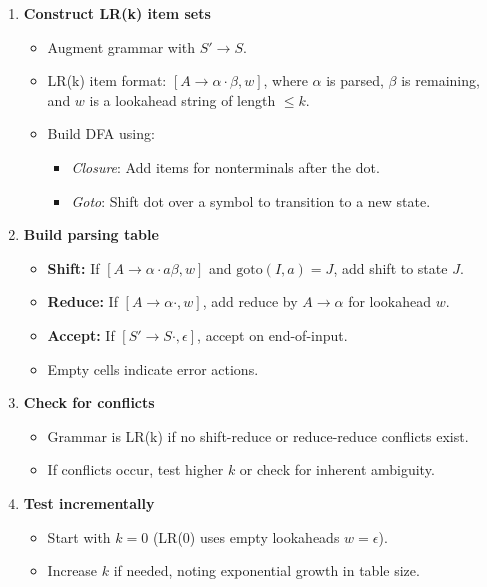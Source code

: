 \begin{enumerate}
    \item \textbf{Construct LR(k) item sets}
    \begin{itemize}
        \item Augment grammar with \( S' \to S \).
        \item LR(k) item format: \( [A \to \alpha \cdot \beta, w] \), where \( \alpha \) is parsed, \( \beta \) is remaining, and \( w \) is a lookahead string of length \( \leq k \).
        \item Build DFA using:
        \begin{itemize}
            \item \emph{Closure}: Add items for nonterminals after the dot.
            \item \emph{Goto}: Shift dot over a symbol to transition to a new state.
        \end{itemize}
    \end{itemize}

    \item \textbf{Build parsing table}
    \begin{itemize}
        \item \textbf{Shift:} If \( [A \to \alpha \cdot a \beta, w] \) and \(\text{goto}(I, a) = J\), add shift to state \( J \).
        \item \textbf{Reduce:} If \( [A \to \alpha \cdot, w] \), add reduce by \( A \to \alpha \) for lookahead \( w \).
        \item \textbf{Accept:} If \( [S' \to S \cdot, \epsilon] \), accept on end-of-input.
        \item Empty cells indicate error actions.
    \end{itemize}

    \item \textbf{Check for conflicts}
    \begin{itemize}
        \item Grammar is LR(k) if no shift-reduce or reduce-reduce conflicts exist.
        \item If conflicts occur, test higher \( k \) or check for inherent ambiguity.
    \end{itemize}

    \item \textbf{Test incrementally}
    \begin{itemize}
        \item Start with \( k = 0 \) (LR(0) uses empty lookaheads \( w = \epsilon \)).
        \item Increase \( k \) if needed, noting exponential growth in table size.
    \end{itemize}
\end{enumerate}

